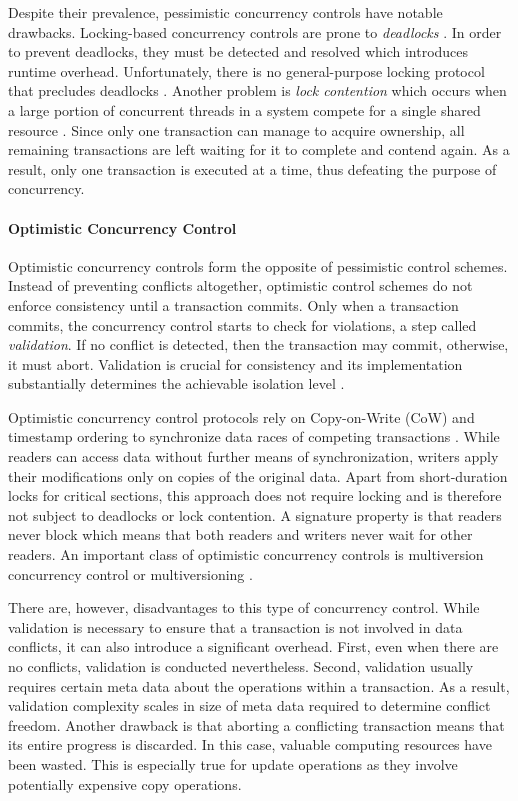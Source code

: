 Despite their prevalence, pessimistic concurrency controls have notable
drawbacks. Locking-based concurrency controls are prone to \emph{deadlocks}
\cite{bernstein1981concurrency, kung1981optimistic}. In order to prevent
deadlocks, they must be detected and resolved which introduces runtime overhead.
Unfortunately, there is no general-purpose locking protocol that precludes
deadlocks \cite{kung1981optimistic}. Another problem is \emph{lock contention}
which occurs when a large portion of concurrent threads in a system compete for
a single shared resource \cite{berenson1995critique, sadoghi2014reducing}. Since
only one transaction can manage to acquire ownership, all remaining transactions
are left waiting for it to complete and contend again. As a result, only one
transaction is executed at a time, thus defeating the purpose of concurrency.

\paragraph{Optimistic Concurrency Control}

Optimistic concurrency controls form the opposite of pessimistic control
schemes. Instead of preventing conflicts altogether, optimistic control schemes
do not enforce consistency until a transaction commits. Only when a transaction
commits, the concurrency control starts to check for violations, a step called
\emph{validation}. If no conflict is detected, then the transaction may commit,
otherwise, it must abort. Validation is crucial for consistency and its
implementation substantially determines the achievable isolation level
\cite{larson2011high}.

Optimistic concurrency control protocols rely on Copy-on-Write (CoW) and
timestamp ordering to synchronize data races of competing transactions
\cite{bernstein1981concurrency, kung1981optimistic}. While readers can access
data without further means of synchronization, writers apply their modifications
only on copies of the original data. Apart from short-duration locks for
critical sections, this approach does not require locking and is therefore not
subject to deadlocks or lock contention. A signature property is that readers
never block which means that both readers and writers never wait for other
readers. An important class of optimistic concurrency controls is
multiversion concurrency control or multiversioning
\cite{bernstein1983multiversion}.

There are, however, disadvantages to this type of concurrency control. While
validation is necessary to ensure that a transaction is not involved in data
conflicts, it can also introduce a significant overhead. First, even when there
are no conflicts, validation is conducted nevertheless. Second, validation
usually requires certain meta data about the operations within a transaction. As
a result, validation complexity scales in size of meta data required to
determine conflict freedom. Another drawback is that aborting a conflicting
transaction means that its entire progress is discarded. In this case, valuable
computing resources have been wasted. This is especially true for update
operations as they involve potentially expensive copy operations.

